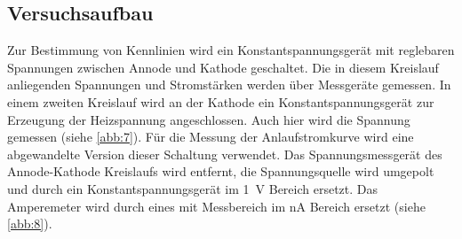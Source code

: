 \subsection{Versuchsaufbau}
Zur Bestimmung von Kennlinien wird ein Konstantspannungsgerät mit reglebaren Spannungen
zwischen Annode und Kathode geschaltet. Die in diesem
Kreislauf anliegenden Spannungen und Stromstärken werden über Messgeräte gemessen.
In einem zweiten Kreislauf wird an der Kathode ein Konstantspannungsgerät zur Erzeugung
der Heizspannung angeschlossen. Auch hier wird die Spannung gemessen (siehe \ref{abb:7}).
Für die Messung der Anlaufstromkurve wird eine abgewandelte Version dieser Schaltung
verwendet. Das Spannungsmessgerät des Annode-Kathode
Kreislaufs wird entfernt, die Spannungsquelle wird umgepolt und durch ein Konstantspannungsgerät
im \SI{1}{\volt} Bereich ersetzt. Das Amperemeter wird durch eines mit Messbereich im \si{\nano\ampere}
Bereich ersetzt (siehe \ref{abb:8}).
